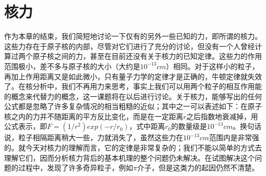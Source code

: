 \section{核力}

作为本章的结束，我们简短地讨论一下仅有的另外一些已知的力，即所谓的核力。这些力存在于原子核的内部，尽管对它们进行了充分的讨论，但没有一个人曾经计算过两个原子核之间的力，甚至在目前还没有关于核力的已知定律。这些力的作用范围极小，差不多与原子核的大小（大约是$10^{-13}cm$）相同。对于这样小的粒子，再加上作用距离又是如此微小，只有量子力学的定律才是正确的，牛顿定律就失效了。在核分析中，我们不再用力来思考，事实上我们可以用两个粒子的相互作用能的概念来代替力的概念，这一课题将在以后进行讨论。关于核力，能够写出的任何公式都是忽略了许多复杂情况的相当粗糙的近似；其中之一可以表述如下：在原子核之内的力并不随距离的平方反比变化，而是在一定距离$r$之后指数地衰减掉，用公式表示，即$F=(1/r^2)exp(-r/r_0)$，式中距离$r_0$的数量级是$10^{-13}cm$。换句话说，粒子相隔距离稍大一些，力就消失了，虽然这些力在$10^{-13}cm$范围内是非常强的。就今天对核力的理解而言，它的定律是非常复杂的；我们不能以简单的方式去理解它们，因而分析核力背后的基本机理的整个问题仍未解决。在试图解决这个问题的过程中，发现了许多奇异粒子，例如$\pi$介子，但是这类力的起因仍然不清楚。